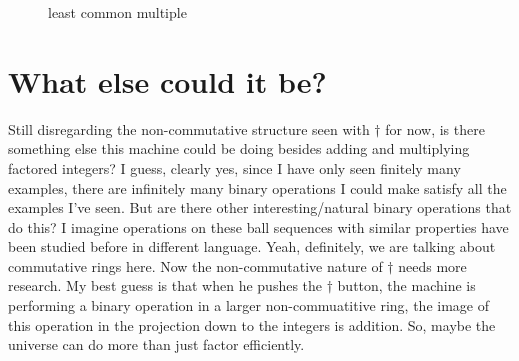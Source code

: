 \documentclass[12pt]{article}
\newcommand{\fancy}[1]{\mathcal{#1}}
\newcommand{\C}[1]{\fancy{C}_{#1}}
\def\C{\fancy{C}}
\def\lcm{\bigtriangleup}
\newcommand{\Bond}[6]%
{ \begin{pgfonlayer}{background}
        \colorlet{InColor}{#4}
        \colorlet{OutColor}{#5}
        \foreach \I in {#6,...,1}
        {   \pgfmathsetlengthmacro{\r}{#3/#6*\I}
            \pgfmathsetmacro{\C}{sqrt(1-\r*\r/#3/#3)*100}
            \draw[InColor!\C!OutColor, line width=\r] (#1.center) -- (#2.center);
        }
    \end{pgfonlayer}
}
\newcommand{\BlackBond}[2]%
{   \Bond{#1}{#2}{0.7071mm}{black!25}{black!25!black}{10}
}
\begin{document}
\begin{figure}
\centering
{}
\caption{least common multiple}
\label{leastcommon}
\end{figure}
\section{What else could it be?}
Still disregarding the non-commutative structure seen with $\dagger$ for now, is there something else this machine could be doing besides adding and multiplying factored integers?  
I guess, clearly yes, since I have only seen finitely many examples, there are infinitely many binary operations I could make satisfy all the examples I've seen.  But are there
other interesting/natural binary operations that do this?  I imagine operations on these ball sequences with similar properties have been studied before in different language.  
Yeah, definitely, we are talking about commutative rings here.  Now the non-commutative nature of $\dagger$ needs more research.  My best guess is that when
he pushes the $\dagger$ button, the machine is performing a binary operation in a larger non-commuatitive ring, the image of this operation in the projection down to the integers 
is addition.  So, maybe the universe can do more than just factor efficiently.
\end{document}
